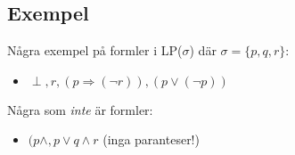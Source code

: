 \subsection{Exempel}
\par\bigskip

Några exempel på formler i LP($\sigma$) där $\sigma = \{p,q,r\}$:
\begin{itemize}
  \item $\perp, r, (p\Rightarrow(\neg r)), (p\vee(\neg p))$
\end{itemize}
\par\bigskip

Några som \textit{inte} är formler:

\begin{itemize}
  \item $(p\wedge, p\vee q\wedge r$ (inga paranteser!)
\end{itemize}
